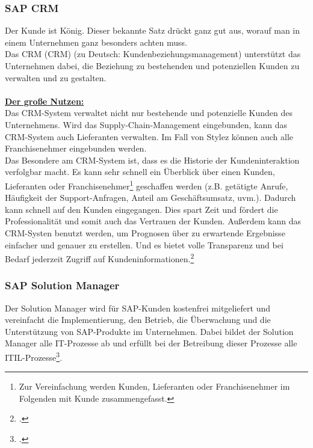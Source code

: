 \subsubsection{SAP CRM}
\glqq Der Kunde ist König\grqq. Dieser bekannte Satz drückt ganz gut aus, worauf man in einem Unternehmen ganz besonders achten muss.\\
Das \acrlong{CRM} (CRM) (zu Deutsch: Kundenbeziehungsmanagement) unterstützt das Unternehmen dabei, die Beziehung zu bestehenden und potenziellen Kunden zu verwalten und zu gestalten.\\
\\
\underline{\textbf{Der große Nutzen:}}\\
Das CRM-System verwaltet nicht nur bestehende und potenzielle Kunden des Unternehmens. Wird das Supply-Chain-Management eingebunden, kann das CRM-System auch Lieferanten verwalten. Im Fall von Stylez können auch alle Franchisenehmer eingebunden werden.\\
Das Besondere am CRM-System ist, dass es die Historie der Kundeninteraktion verfolgbar macht. Es kann sehr schnell ein Überblick über einen Kunden, Lieferanten oder Franchisenehmer\footnote{Zur Vereinfachung werden Kunden, Lieferanten oder Franchisenehmer im Folgenden mit Kunde zusammengefasst.} geschaffen werden (z.B. getätigte Anrufe, Häufigkeit der Support-Anfragen, Anteil am Geschäftsumsatz, uvm.).
Dadurch kann schnell auf den Kunden eingegangen. Dies spart Zeit und fördert die Professionalität und somit auch das Vertrauen der Kunden. Außerdem kann das CRM-Systen benutzt werden, um Prognosen über zu erwartende Ergebnisse einfacher und genauer zu erstellen. Und es bietet volle Transparenz und bei Bedarf jederzeit Zugriff auf Kundeninformationen.\footcite[vgl.][]{CRM}

\subsubsection{SAP Solution Manager}
Der Solution Manager wird für SAP-Kunden kostenfrei mitgeliefert und vereinfacht die Implementierung, den Betrieb, die Überwachung und die Unterstützung von SAP-Produkte im Unternehmen. Dabei bildet der Solution Manager alle IT-Prozesse ab und erfüllt bei der Betreibung dieser Prozesse alle ITIL-Prozesse\footcite[vgl.][]{SAPITIL}.

